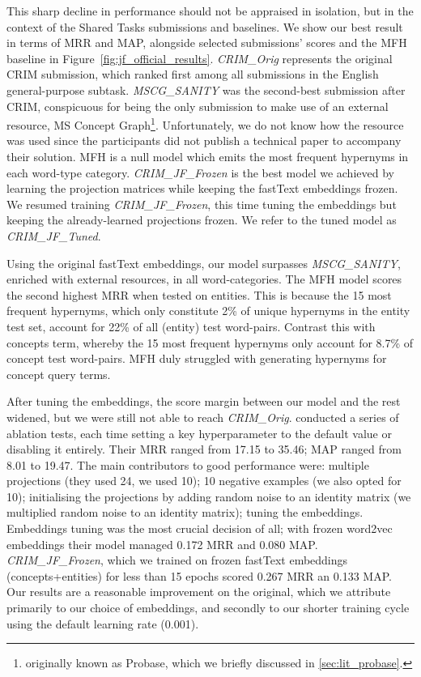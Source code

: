 This sharp decline in performance should not be appraised in isolation, but in the context of the Shared Tasks submissions and baselines.  We show our best result in terms of \ac{MRR} and \ac{MAP}, alongside selected submissions' scores and the \ac{MFH} baseline in Figure~\ref{fig:jf_official_results}.  \textit{CRIM\_Orig} represents the original CRIM submission, which ranked first among all submissions in the English general-purpose subtask.  \textit{MSCG\_SANITY} was the second-best submission after CRIM, conspicuous for being the only submission to make use of an external resource, MS Concept Graph\footnote{originally known as Probase, which we briefly discussed in \cref{sec:lit_probase}.}.  Unfortunately, we do not know how the resource was used since the participants did not publish a technical paper to accompany their solution.  \ac{MFH} is a null model which emits the most frequent hypernyms in each word-type category.  \textit{CRIM\_JF\_Frozen} is the best model we achieved by learning the projection matrices while keeping the fastText embeddings frozen.  We resumed training \textit{CRIM\_JF\_Frozen}, this time tuning the embeddings but keeping the already-learned projections frozen.  We refer to the tuned model as \textit{CRIM\_JF\_Tuned}. 

Using the original fastText embeddings, our model surpasses \textit{MSCG\_SANITY}, enriched with external resources, in all word-categories.  The \ac{MFH} model scores the second highest \ac{MRR} when tested on entities.  This is because the 15 most frequent hypernyms, which only constitute  2\% of unique hypernyms in the entity test set, account for 22\% of all (entity) test word-pairs.  Contrast this with concepts term,  whereby the 15 most frequent hypernyms only account for 8.7\% of concept test word-pairs.  \ac{MFH} duly struggled with generating hypernyms for concept query terms.

After tuning the embeddings, the score margin between our model and the rest widened, but we were still not able to reach \textit{CRIM\_Orig}.  \citeauthor{bernier2018crim} conducted a series of ablation tests, each time setting a key hyperparameter to the default value or disabling it entirely.  Their \ac{MRR} ranged from 17.15 to 35.46; \ac{MAP} ranged from 8.01 to 19.47.  The main contributors to good performance were: multiple projections (they used 24, we used 10); 10 negative examples (we also opted for 10); initialising the projections by adding random noise to an identity matrix (we multiplied random noise to an identity matrix); tuning the embeddings.  Embeddings tuning was the most crucial decision of all; with frozen word2vec embeddings their model managed 0.172 \ac{MRR} and 0.080 \ac{MAP}.  \textit{CRIM\_JF\_Frozen}, which we trained on frozen fastText embeddings (concepts+entities) for less than 15 epochs scored 0.267 \ac{MRR} an 0.133 \ac{MAP}.  Our results are a reasonable improvement on the original, which we attribute primarily to our choice of embeddings, and secondly to our shorter training cycle using the default learning rate (0.001).

